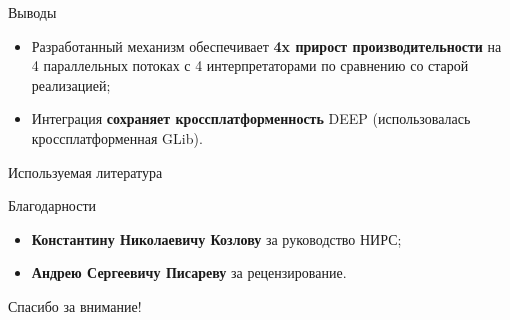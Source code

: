 \documentclass{beamer}
\begin{document}
\begin{frame}{Выводы}
\begin{itemize}
    \itemsep 2em
    \item Разработанный механизм обеспечивает
        \textbf{4x прирост производительности}
        на 4 параллельных потоках с 4 интерпретаторами по
        сравнению со старой реализацией;
    \item Интеграция \textbf{сохраняет кроссплатформенность} DEEP
        (использовалась кроссплатформенная GLib).
\end{itemize}
\end{frame}

\begin{frame}[t,allowframebreaks]{Используемая литература}
    \nocite{Kozlov11, Kozlov13, Storn95, pisarev2015tracker,
    GLib, zaharie2002parameter, fan2003trigonometric, *}
    
\end{frame}

\begin{frame}{Благодарности}
    \begin{itemize}
        \itemsep 2em
        \item \textbf{Константину Николаевичу Козлову}
            за руководство НИРС;
        \item \textbf{Андрею Сергеевичу Писареву}
            за рецензирование.
    \end{itemize}
    \bigskip

    \vfill
    \begin{center}
        \LARGE Спасибо за внимание!
    \end{center}
\end{frame}
\end{document}

